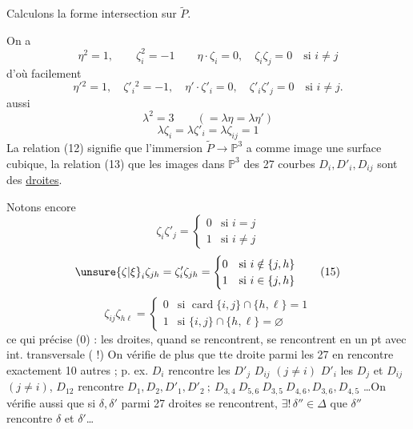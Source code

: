Calculons la forme intersection sur $\widetilde P$.

On a
\[
\eta^2=1,\qquad \zeta_i^2=-1\qquad \eta\cdot\zeta_i=0,\quad\zeta_i\zeta_j=0\quad\text{si }i\ne j\tag*{(10)}
\]
d'où facilement
\[
\eta'{}^2=1,\quad\zeta'_i{}^2=-1,\quad\eta'\cdot\zeta'_i=0,\quad\zeta'_i\zeta'_j=0\quad\text{si }i\ne j.\tag*{(11)}
\]
 aussi
\[
\lambda^2=3\qquad(=\lambda\eta=\lambda\eta')\tag*{(12)}
\]
\[
\lambda\zeta_i=\lambda\zeta'_i=\lambda\zeta_{ij}=1\tag*{(13)}
\]
La relation (12) signifie que l'immersion $\widetilde P\longrightarrow\mathbb P^3$ a comme image une surface cubique, la relation (13) que les images dans $\mathbb P^3$ des 27  courbes $D_i,D'_i,D_{ij}$ sont des \uline{droites}.

Notons encore
\[
\zeta_i\zeta'_j=\begin{cases}0&\text{si }i=j\\1&\text{si }i\ne j\end{cases}\tag*{(14)}
\]
\unsure{(}
\[
\unsure{\zeta|\xi}_i\zeta_{jh}=\zeta'_i\zeta_{jh}=
\begin{cases}0&\text{si }i\notin\{j,h\}\\1&\text{si }i\in\{j,h\}\end{cases}\tag*{(15)}
\]
\[
\zeta_{ij}\zeta_{h\ell}=\begin{cases}
0&\text{si }\operatorname{card}\{i,j\}\cap\{h,\ell\}=1\\
1&\text{si }\{i,j\}\cap\{h,\ell\}=\varnothing
\end{cases}\tag*{(16)}
\]
ce qui précise (0) : les  droites, quand   se rencontrent, se rencontrent en  un pt avec int. transversale ( !) On vérifie de plus que tte droite parmi les 27 en rencontre exactement 10 autres ; p. ex. $D_i$ rencontre les $D'_j$   $D_{ij}$ $(j\ne i)$ $D'_i$ les $D_j$ et $D_{ij}$ $(j\ne i)$, $D_{12}$ rencontre $D_1,D_2,D'_1,D'_2\ ;\ D_{3,4}\ D_{5,6}\ D_{3,5}\ D_{4,6},D_{3,6},D_{4,5}$ \ldots On vérifie aussi que si $\delta,\delta'$ parmi   27 droites se rencontrent, $\exists!\,\delta''\in\Delta$   que $\delta''$ rencontre $\delta$ et $\delta'$\ldots

